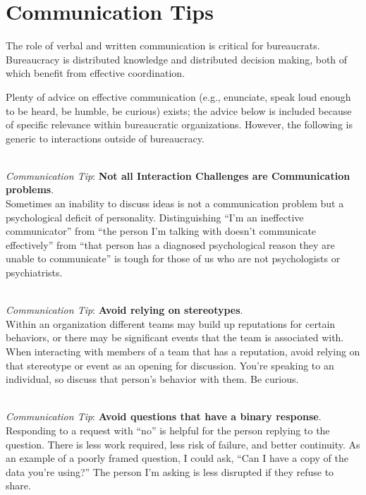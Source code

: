 \section{Communication Tips}

The role of verbal and written communication is critical for bureaucrats. Bureaucracy is distributed knowledge and distributed decision making, both of which benefit from effective coordination. 


Plenty of advice on effective communication (e.g., enunciate, speak loud enough to be heard, be humble, be curious) exists; the advice below is included because of specific relevance within bureaucratic organizations. 
However, the following is generic to interactions outside of bureaucracy. 


\ \\
\textit{Communication Tip}: \textbf{Not all Interaction Challenges are Communication problems}.\\
Sometimes an inability to discuss ideas is not a communication problem but a psychological deficit of personality. Distinguishing ``I'm an ineffective communicator'' from ``the person I'm talking with doesn't communicate effectively'' from ``that person has a diagnosed psychological reason they are unable to communicate'' is tough for those of us who are not psychologists or psychiatrists. 


\ \\
\textit{Communication Tip}: \textbf{Avoid relying on stereotypes}. \\
Within an organization different teams may build up reputations for certain behaviors, or there may be significant events that the team is associated with. 
When interacting with members of a team that has a reputation, avoid relying on that stereotype or event as an opening for discussion. 
You're speaking to an individual, so discuss that person's behavior with them. Be curious.

\ \\
\textit{Communication Tip}: \textbf{Avoid questions that have a binary response\label{sec:yes-no-questions}}.\\
Responding to a request with ``no'' is helpful for the person replying to the question. There is less work required, less risk of failure, and better continuity. As an example of a poorly framed question, I could ask, ``Can I have a copy of the data you're using?'' The person I'm asking is less disrupted if they refuse to share. 

